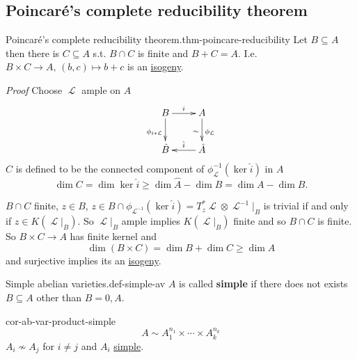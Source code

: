 \documentclass[10pt,]{book}
\makeatletter
\newcommand{\terminology}[1]{\textbf{#1}}
\renewcommand*{\proofname}{Proof}
\renewenvironment{proof}[1][\proofname]{\par
  \pushQED{\qed}%
  \normalfont \topsep6\p@\@plus6\p@\relax
  \trivlist
  \item\relax
    {\itshape
    #1\@addpunct{.}}\hspace\labelsep\ignorespaces
}{%
  \popQED\endtrivlist\@endpefalse
}
\numberwithin{equation}{section}
\newcommand{\sheaf}[1]{\operatorname{\mathcal{#1}}}
\makeatother
\begin{document}
\subsection[{Poincaré's complete reducibility theorem}]{Poincaré's complete reducibility theorem}\label{subsection-24}
\begin{theorem}{Poincaré's complete reducibility theorem.}{}{thm-poincare-reducibility}%
\hypertarget{p-209}{}%
Let \(B\subseteq A\) then there is \(C\subseteq A\) s.t. \(B \cap C\) is finite and \(B+C = A\). I.e. \(B\times C \to A,\,(b,c) \mapsto b+c\) is an \hyperref[def-supersing-isog-isog]{isogeny}.%
\end{theorem}
\begin{proof}\hypertarget{proof-38}{}
\hypertarget{p-210}{}%
Choose \(\sheaf L\) ample on \(A\)%
\begin{equation*}
\xymatrix{
B\ar[r]^i \ar[d]_{\phi_{i*\sheaf L}} & A \ar[d]_\sim^{\phi_{\sheaf L}} \\
\hat B & \hat A \ar[l]_{\hat i}
}
\end{equation*}
\(C\) is defined to be the connected component of \(\phi^{-1}_{\sheaf L}(\ker \hat i)\) in \(A\)%
\begin{equation*}
\dim C = \dim \ker \hat i \ge \dim \hat A - \dim \hat B = \dim A - \dim B\text{.}
\end{equation*}
%
\par
\hypertarget{p-211}{}%
\(B \cap C\) finite, \(z\in B\), \(z\in B\cap \phi_{\sheaf L^{-1}} (\ker \hat i) = T_z^* \sheaf L \otimes \sheaf L^{-1} |_B\) is trivial if and only if \(z\in K(\sheaf L|_B)\). So \(\sheaf L|_B\) ample implies \(K(\sheaf L|_B)\) finite and so \(B\cap C\) is finite. So \(B\times C \to A\) has finite kernel and%
\begin{equation*}
\dim (B\times C) = \dim B + \dim C \ge \dim A
\end{equation*}
and surjective implies its an \hyperref[def-supersing-isog-isog]{isogeny}.%
\end{proof}
\begin{definition}{Simple abelian varieties.}{def-simple-av}%
\hypertarget{p-212}{}%
\(A\) is called \terminology{simple} if there does not exists \(B\subseteq A\) other than \(B = 0,A\).%
\end{definition}
\begin{corollary}{}{}{cor-ab-var-product-simple}%
\hypertarget{p-213}{}%
%
\begin{equation*}
A \sim A_1^{n_1} \times \cdots \times A_k^{n_k}
\end{equation*}
\(A_i \not\sim A_j\) for \(i\ne j\) and \(A_i\) \hyperref[def-simple-av]{simple}.%
\end{corollary}
\end{document}
